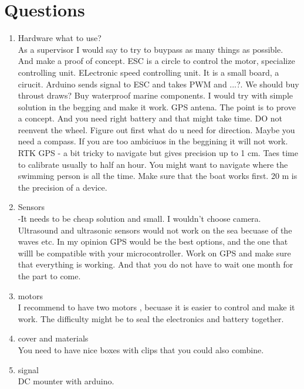 \documentclass{article}[10pt]
\begin{document}
\section{Questions}
\begin{enumerate}
    \item Hardware what to use?\\
As a supervisor I would say to try to buypass as many things as possible. And make a proof of concept. ESC is a circle to control the motor, specialize controlling unit. ELectronic speed controlling unit.
It is a small board, a cirucit. Arduino sends signal to ESC and takes PWM and ...?. We should buy throust draws? 
Buy waterproof marine components. I would try with simple solution in the begging and make it work. GPS antena. 
The point is to prove a concept. And you need right battery and that might take time. DO not reenvent the wheel. Figure out first what do u need 
for direction. Maybe you need a compass. If you are too ambiciuos in the beggining it will not work. RTK GPS - a bit tricky to navigate but gives precision up to 1 cm. Taes time to calibrate 
usually to half an hour. You might want to navigate where the swimming person is all the time. Make sure that the boat works first. 
20 m is the precision of a device. \\
    \item Sensors\\
-It needs to be cheap solution and small. I wouldn't choose camera. Ultrasound and ultrasonic sensors would not work on the sea becuase of the waves etc. 
In my opinion GPS would be the best options, and the one that willl be compatible with your microcontroller. Work on GPS and make sure that everything is working. 
And that you do not have to wait one month for the part to come. \\
    \item motors\\
I recommend to have two motors , becuase it is easier to control and make it work. The difficulty might be to seal the electronics and battery together. \\
    \item cover and materials\\
You need to have nice boxes with clips that you could also combine. \\
    \item signal\\
DC mounter with arduino. 
\end{enumerate}
\end{document}
